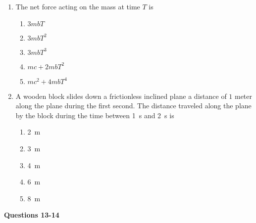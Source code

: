 \documentclass{../../oss-apphys}
\begin{document}
\begin{multicols}{2}
\begin{enumerate}[resume,leftmargin=18pt]
  \item The net force acting on the mass at time $T$ is
    \begin{enumerate}[noitemsep,topsep=0pt,leftmargin=18pt,label=(\Alph*)]
    \item $3mbT$
    \item $3mbT^2$
    \item $3mbT^3$
    \item $mc+2mbT^2$
    \item $mc^2+4mbT^4$
    \end{enumerate}

  \item A wooden block slides down a frictionless inclined plane a distance of
    $1$ meter along the plane during the first second. The distance traveled
    along the plane by the block during the time between \SI{1}{s} and \SI{2}{s}
    is
    \begin{enumerate}[noitemsep,topsep=0pt,leftmargin=18pt,label=(\Alph*)]
    \item\SI{2}{\metre}
    \item\SI{3}{\metre}
    \item\SI{4}{\metre}
    \item\SI{6}{\metre}
    \item\SI{8}{\metre}
    \end{enumerate}

  \end{enumerate}
  \columnbreak
  
  \textbf{Questions 13-14}


\end{multicols}
\end{document}
